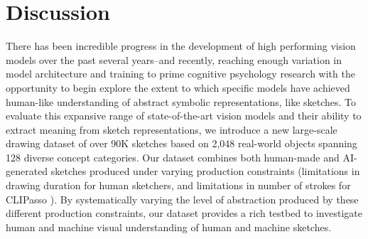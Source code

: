 \documentclass[10pt,letterpaper]{article}
\begin{document}

\vspace{-.5em}
\section{Discussion}

There has been incredible progress in the development of high performing vision models over the past several years--and recently, reaching enough variation in model architecture and training to prime cognitive psychology research with the opportunity to begin explore the extent to which specific models have achieved human-like understanding of abstract symbolic representations, like sketches.
To evaluate this expansive range of state-of-the-art vision models and their ability to extract meaning from sketch representations, we introduce a new large-scale drawing dataset of over 90K sketches based on 2,048 real-world objects spanning 128 diverse concept categories.
Our dataset combines both human-made and AI-generated sketches produced under varying production constraints (limitations in drawing duration for human sketchers, and limitations in number of strokes for CLIPasso \cite{vinker2022clipasso}). 
By systematically varying the level of abstraction produced by these different production constraints, our dataset provides a rich testbed to investigate human and machine visual understanding of human and machine sketches. 
\end{document}
